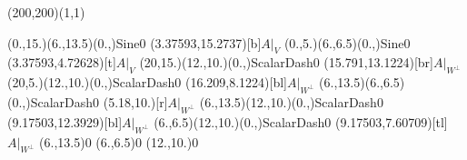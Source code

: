 \unitlength=1bp%

\begin{feynartspicture}(200,200)(1,1)

\FADiagram{}
\FAProp(0.,15.)(6.,13.5)(0.,){Sine}{0}
\FALabel(3.37593,15.2737)[b]{$A|_V$}
\FAProp(0.,5.)(6.,6.5)(0.,){Sine}{0}
\FALabel(3.37593,4.72628)[t]{$A|_V$}
\FAProp(20,15.)(12.,10.)(0.,){ScalarDash}{0}
\FALabel(15.791,13.1224)[br]{$A|_{W^\perp}$}
\FAProp(20,5.)(12.,10.)(0.,){ScalarDash}{0}
\FALabel(16.209,8.1224)[bl]{$A|_{W^\perp}$}
\FAProp(6.,13.5)(6.,6.5)(0.,){ScalarDash}{0}
\FALabel(5.18,10.)[r]{$A|_{W^\perp}$}
\FAProp(6.,13.5)(12.,10.)(0.,){ScalarDash}{0}
\FALabel(9.17503,12.3929)[bl]{$A|_{W^\perp}$}
\FAProp(6.,6.5)(12.,10.)(0.,){ScalarDash}{0}
\FALabel(9.17503,7.60709)[tl]{$A|_{W^\perp}$}
\FAVert(6.,13.5){0}
\FAVert(6.,6.5){0}
\FAVert(12.,10.){0}
\end{feynartspicture}

